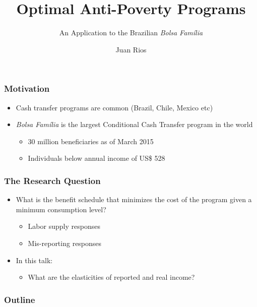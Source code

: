 \documentclass[xcolor=pdftex,dvipsnames,table]{beamer}
\begin{document}
\title{Optimal Anti-Poverty Programs}
\subtitle{An Application to the Brazilian \textit{Bolsa Fam\'ilia}}
\author{Juan Rios}

\maketitle

\begin{frame}
 \frametitle{Motivation}
\begin{itemize}
\item Cash transfer programs are common (Brazil, Chile, Mexico etc)
\item \textit{Bolsa Fam\'ilia} is the largest Conditional Cash Transfer program in the world
\begin{itemize}
\item 30 million beneficiaries as of March 2015
\item Individuals below annual income of US\$ 528
\end{itemize}
\end{itemize}
\end{frame}

\begin{frame}[label=question]
 \frametitle{The Research Question}
\begin{itemize}
\item What is the benefit schedule that minimizes the cost of the program given a minimum consumption level?
\begin{itemize}
\item Labor supply responses
\item Mis-reporting responses
\end{itemize}
\item In this talk:
\begin{itemize}
\item What are the elasticities of reported and real income?
\end{itemize}
\end{itemize}
\hyperlink{literature}{}
\end{frame}

\begin{frame}
    \frametitle{Outline}
    \tableofcontents[pausesections]
\end{frame}
\end{document}
